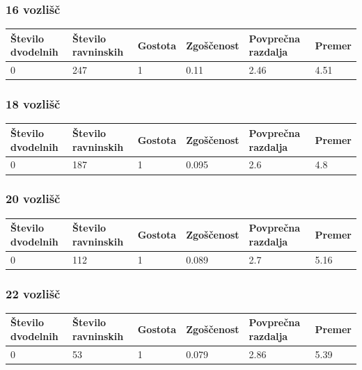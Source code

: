 \documentclass[11pt,a4paper,titlepage]{article}
\begin{document}
\subsubsection{16 vozlišč}
\begin{table}[H]
	\begin{tabular}{|l|l|l|l|l|l|}
		\hline
		Število dvodelnih	& Število ravninskih  & Gostota  & Zgoščenost & Povprečna razdalja & Premer \\ \hline
		0 & 247  & 1 & 0.11 & 2.46 & 4.51 \\ \hline
	\end{tabular}
\end{table}

\subsubsection{18 vozlišč}
\begin{table}[H]
	\begin{tabular}{|l|l|l|l|l|l|}
		\hline
		Število dvodelnih	& Število ravninskih  & Gostota  & Zgoščenost & Povprečna razdalja & Premer \\ \hline
		0 & 187  & 1 & 0.095 & 2.6 & 4.8 \\ \hline
	\end{tabular}
\end{table}
\subsubsection{20 vozlišč}
\begin{table}[H]
	\begin{tabular}{|l|l|l|l|l|l|}
		\hline
		Število dvodelnih	& Število ravninskih  & Gostota  & Zgoščenost & Povprečna razdalja & Premer \\ \hline
		0 & 112  & 1 & 0.089 & 2.7 & 5.16 \\ \hline
	\end{tabular}
\end{table}
\subsubsection{22 vozlišč}
\begin{table}[H]
	\begin{tabular}{|l|l|l|l|l|l|}
		\hline
		Število dvodelnih	& Število ravninskih  & Gostota  & Zgoščenost & Povprečna razdalja & Premer \\ \hline
		0 &  53 & 1 & 0.079 & 2.86 & 5.39 \\ \hline
	\end{tabular}
\end{table}
\end{document}
